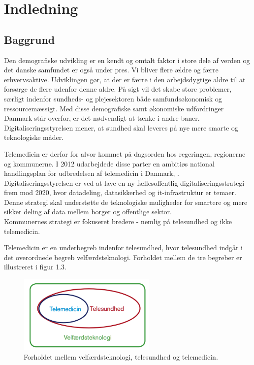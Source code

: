\chapter{Indledning}

\section{Baggrund}
Den demografiske udvikling er en kendt og omtalt faktor i store dele af verden og  det danske samfundet er også under pres. Vi bliver flere ældre og færre erhvervsaktive\cite{KL}. Udviklingen gør, at der er færre i den arbejdsdygtige aldre til at forsørge de flere udenfor denne aldre. På sigt vil det skabe store problemer, særligt indenfor sundheds- og plejesektoren både samfundsøkonomisk og ressourcemæssigt. Med disse demografiske samt økonomiske udfordringer Danmark står overfor, er det nødvendigt at tænke i andre baner. Digitaliseringsstyrelsen mener, at sundhed skal leveres på nye mere smarte og teknologiske måder\cite{Digst}.    

Telemedicin er derfor for alvor kommet på dagsorden hos regeringen, regionerne og kommunerne. I 2012 udarbejdede disse parter en ambitiøs national handlingsplan for udbredelsen af telemedicin i Danmark\cite{Digst}, \cite{NationalH}.\\
Digitaliseringsstyrelsen er ved at lave en ny fællesoffentlig digitaliseringsstrategi frem mod 2020, hvor datadeling, datasikkerhed og it-infrastruktur er temaer\cite{digst1}. Denne strategi skal understøtte de teknologiske muligheder for smartere og mere sikker deling af data mellem borger og offentlige sektor\cite{digst2}.\\
Kommunernes strategi er fokuseret bredere - nemlig på telesundhed og ikke telemedicin.

Telemedicin er en underbegreb indenfor telesundhed, hvor telesundhed indgår i det overordnede begreb velfærdsteknologi\cite{KLs}. Forholdet mellem de tre begreber er illustreret i figur 1.3. 

\begin{figure}[H]
	\centering
		\caption{Forholdet mellem velfærdsteknologi, telesundhed og telemedicin\cite{KLs}.}
	\includegraphics[width=0.6\textwidth]{Figurer/Snip20160426_6}
\end{figure}

